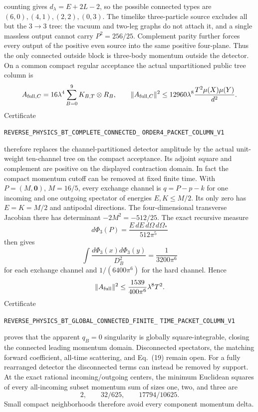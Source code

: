 \documentclass[11pt]{article}
\theoremstyle{definition}
\theoremstyle{remark}
\begin{document}
counting gives $d_\lambda=E+2L-2$, so the possible connected types are
$(6,0),(4,1),(2,2),(0,3)$.  The timelike three-particle source excludes all
but the $3\to3$ tree: the vacuum and two-leg graphs do not attach it, and a
single massless output cannot carry $P^2=256/25$.  Complement parity further
forces every output of the positive even source into the same positive
four-plane.  Thus the only connected outside block is three-body momentum
outside the detector.  On a common compact regular acceptance the actual
unpartitioned public tree column is
\[
 A_{{\rm full},C}=16\lambda^4
 \sum_{B=0}^{9}K_{B,T}\otimes R_B,
 \qquad
 \|A_{{\rm full},C}\|^2\le
 12960\lambda^8\frac{T^2\mu(X)\mu(Y)}{d^2}.
\]
Certificate
\par\noindent
\texttt{REVERSE\_PHYSICS\_BT\_COMPLETE\_CONNECTED\_}
\allowbreak\texttt{ORDER4\_PACKET\_COLUMN\_V1}
\par\noindent
therefore replaces the channel-partitioned detector amplitude by the actual
unit-weight ten-channel tree on the compact acceptance.  Its adjoint square
and complement are positive on the displayed contraction domain.  In fact
the compact momentum cutoff can be removed at fixed finite time.  With
$P=(M,\mathbf0)$, $M=16/5$, every exchange channel is $q=P-p-k$ for one
incoming and one outgoing spectator of energies $E,K\leq M/2$.  Its only zero
has $E=K=M/2$ and antipodal directions.  The four-dimensional transverse
Jacobian there has determinant $-2M^2=-512/25$.  The exact recursive measure
\[
 d\Phi_3(P)=\frac{E\,dE\,d\Omega\,d\Omega_*}{512\pi^5}
\]
then gives
\[
 \int\frac{d\Phi_3(x)d\Phi_3(y)}{D_B^2}
 =\frac1{3200\pi^6}
\]
for each exchange channel and $1/(6400\pi^6)$ for the hard channel.  Hence
\[
 \|A_{\rm full}\|^2\leq
 \frac{1539}{400\pi^6}\lambda^8T^2.
\]
Certificate
\par\noindent
\texttt{REVERSE\_PHYSICS\_BT\_GLOBAL\_CONNECTED\_FINITE\_}
\allowbreak\texttt{TIME\_PACKET\_COLUMN\_V1}
\par\noindent
proves that the apparent $q_B=0$ singularity is globally square-integrable,
closing the connected leading momentum domain.  Disconnected spectators, the
matching forward coefficient, all-time scattering, and Eq.~(19) remain open.
For a fully rearranged detector the disconnected terms can instead be removed
by support.  At the exact rational incoming/outgoing centers, the minimum
Euclidean squares of every all-incoming subset momentum sum of sizes one,
two, and three are
\[
 2,\qquad 32/625,\qquad 17794/10625.
\]
Small compact neighborhoods therefore avoid every component momentum delta.
\end{document}
